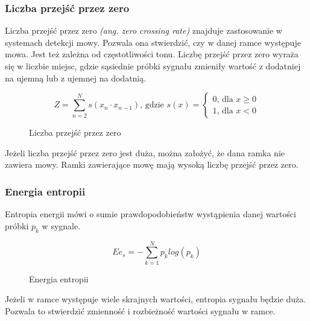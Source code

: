 \documentclass[a4paper,12pt,twoside,openany]{report}
\newcommand{\ang}[1]{\textit{(ang. #1)}}
\begin{document}
\subsubsection{Liczba przejść przez zero}
Liczba przejść przez zero \ang{zero crossing rate} znajduje zastosowanie w systemach detekcji mowy.
Pozwala ona stwierdzić, czy w danej ramce występuje mowa.
Jest też zależna od częstotliwości tonu. 
Liczbę przejść przez zero wyraża się w liczbie miejsc, gdzie sąsiednie próbki sygnału zmieniły wartość z dodatniej na ujemną lub z ujemnej na dodatnią.
\begin{figure}[h]
	\begin{equation}
		Z = \sum_{n=2}^{N}s(x_n \cdot x_{n-1})\text{, gdzie } s(x) = 
		\begin{cases} 
			0 \text{, dla } x \geq 0 \\
			1 \text{, dla } x < 0
		\end{cases}
		\label{eq:zcr}
	\end{equation}
	\caption{Liczba przejść przez zero}
\end{figure}
Jeżeli liczba przejść przez zero jest duża, można założyć, że dana ramka nie zawiera mowy.
Ramki zawierające mowę mają wysoką liczbę przejść przez zero. \cite{Walters-Williams2010}
\subsubsection{Energia entropii}
Entropia energii mówi o sumie prawdopodobieństw wystąpienia danej wartości próbki $p_k$ w sygnale.
\begin{figure}[h]
	\begin{equation}
		Ee_{s}=-\sum _{k=1}^{N}p_k log(p_k)
		\label{eq:entropy_energy}
	\end{equation}
	\caption{Energia entropii}
\end{figure}\cite{Majstorovic2011}
Jeżeli w ramce występuje wiele skrajnych wartości, entropia sygnału będzie duża. 
Pozwala to stwierdzić zmienność i rozbieżność wartości sygnału w ramce.
\end{document}
